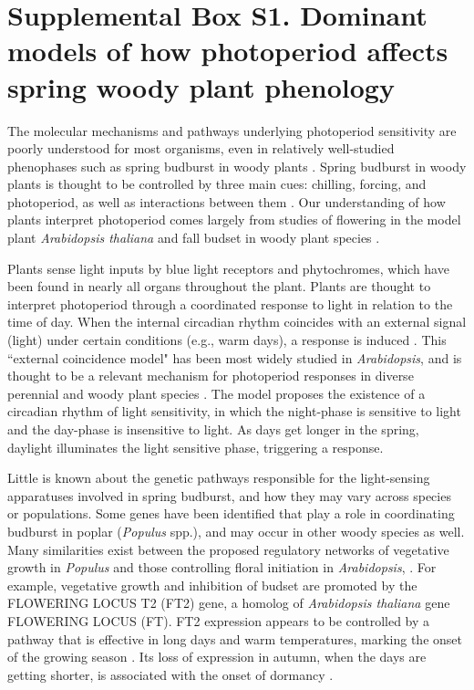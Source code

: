\documentclass{article}
\begin{document}
\section*{Supplemental Box S1. Dominant models of how photoperiod affects spring woody plant phenology}
\par The molecular mechanisms and pathways underlying photoperiod sensitivity are poorly understood for most organisms, even in relatively well-studied phenophases such as spring budburst in woody plants \citep{ding2016}. Spring budburst in woody plants is thought to be controlled by three main cues: chilling, forcing, and photoperiod, as well as interactions between them \citep{flynn2018,Heide:2008aa, zohner2016}. Our understanding of how plants interpret photoperiod comes largely from studies of flowering in the model plant \emph{Arabidopsis thaliana} \citep[e.g.,][]{suarez2001} and fall budset in woody plant species \citep[e.g., ][]{Howe:1996}. %
\par Plants sense light inputs by blue light receptors and phytochromes, which have been found in nearly all organs throughout the plant. Plants are thought to interpret photoperiod through a coordinated response to light in relation to the time of day. When the internal circadian rhythm coincides with an external signal (light) under certain conditions (e.g., warm days), a response is induced \citep{lagercrantz2009}. This ``external coincidence model" has been most widely studied in \emph{Arabidopsis}, and is thought to be a relevant mechanism for photoperiod responses in diverse perennial and woody plant species \citep{bunning1936,davis2002,bastow2002,kobayashi2007,andres2012,petterle2013,Singh:2017}.  
The model proposes the existence of a circadian rhythm of light sensitivity, in which the night-phase is sensitive to light and the day-phase is insensitive to light. As days get longer in the spring, daylight illuminates the  light sensitive phase, triggering a response. %
\par Little is known about the genetic pathways responsible for the light-sensing apparatuses involved in spring budburst, and how they may vary across species or populations. Some genes have been identified that play a role in coordinating budburst in poplar (\emph{Populus} spp.), and may occur in other woody species as well. Many similarities exist between the proposed regulatory networks of vegetative growth in \emph{Populus} and those controlling floral initiation in \emph{Arabidopsis}, \citet{ding2016}. For example, vegetative growth and inhibition of budset are promoted by the FLOWERING LOCUS T2 (FT2) gene, a homolog of \emph{Arabidopsis thaliana} gene FLOWERING LOCUS (FT). FT2 expression appears to be controlled by a pathway that is effective in long days and warm temperatures, marking the onset of the growing season \citep{hsu2011}. Its loss of expression in autumn, when the days are getting shorter, is associated with the onset of dormancy \citep{glover2014}.
\end{document}
